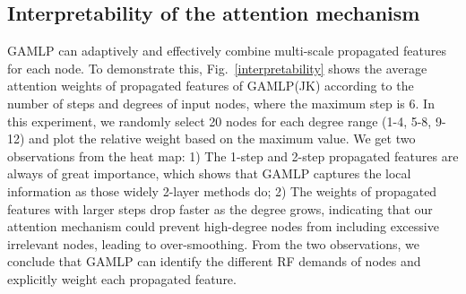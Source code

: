 \documentclass[sigconf]{acmart}
\begin{document}
\subsection{Interpretability of the attention mechanism}
GAMLP can adaptively and effectively combine multi-scale propagated features for each node.
To demonstrate this, Fig.~\ref{interpretability} shows the average attention weights of propagated features of GAMLP(JK) according to the number of steps and degrees of input nodes, where the maximum step is 6. 
In this experiment, we randomly select 20 nodes for each degree range (1-4, 5-8, 9-12) and plot the relative weight based on the maximum value. 
We get two observations from the heat map: 1) The 1-step and 2-step propagated features are always of great importance, which shows that GAMLP captures the local information as those widely 2-layer methods do; 
2) The weights of propagated features with larger steps drop faster as the degree grows, indicating that our attention mechanism could prevent high-degree nodes from including excessive irrelevant nodes, leading to over-smoothing. 
From the two observations, we conclude that GAMLP can identify the different RF demands of nodes and explicitly weight each propagated feature.
\end{document}
